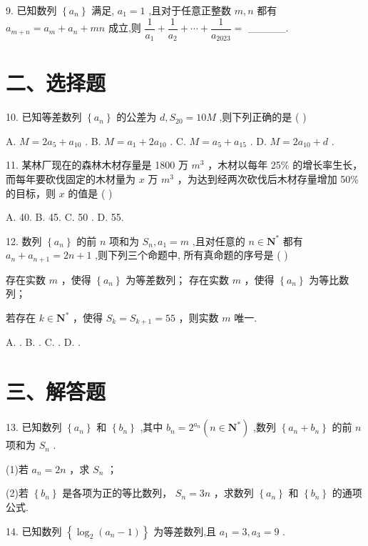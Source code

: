 9. 已知数列 $\left\{  {a}_{n}\right\}$ 满足, ${a}_{1} = 1$ ,且对于任意正整数 $m,n$ 都有 ${a}_{m + n} = {a}_{m} + {a}_{n} + {mn}$ 成立,则 $\dfrac{1}{{a}_{1}} + \dfrac{1}{{a}_{2}} + \cdots  +  \dfrac{1}{{a}_{2023}} =$ \_\_\_\_\_.

\section*{二、选择题}

10. 已知等差数列 $\left\{  {a}_{n}\right\}$ 的公差为 $d,{S}_{20} = {10M}$ ,则下列正确的是 ( )

A. $M = 2{a}_{5} + {a}_{10}$ . B. $M = {a}_{1} + 2{a}_{10}$ . C. $M = {a}_{5} + {a}_{15}$ . D. $M = 2{a}_{10} + d$ .

11. 某林厂现在的森林木材存量是 1800 万 ${{m}}^{3}$ ，木材以每年 25\% 的增长率生长，而每年要砍伐固定的木材量为 $x$ 万 ${{m}}^{3}$ ，为达到经两次砍伐后木材存量增加 50\% 的目标，则 $x$ 的值是 ( )

A. 40. B. 45. C. 50 . D. 55.

12. 数列 $\left\{  {a}_{n}\right\}$ 的前 $n$ 项和为 ${S}_{n},{a}_{1} = m$ ,且对任意的 $n \in  {\mathbf{N}}^{ * }$ 都有 ${a}_{n} + {a}_{n + 1} = {2n} + 1$ ,则下列三个命题中, 所有真命题的序号是 ( )

   存在实数 $m$ ，使得 $\left\{  {a}_{n}\right\}$ 为等差数列；   存在实数 $m$ ，使得 $\left\{  {a}_{n}\right\}$ 为等比数列；

  若存在 $k \in  {\mathbf{N}}^{ * }$ ，使得 ${S}_{k} = {S}_{k + 1} = {55}$ ，则实数 $m$ 唯一.

A.   . B.     . C.     . D.       .

\section*{三、解答题}

13. 已知数列 $\left\{  {a}_{n}\right\}$ 和 $\left\{  {b}_{n}\right\}$ ,其中 ${b}_{n} = {2}^{{a}_{n}}\left( {n \in  {\mathbf{N}}^{ * }}\right)$ ,数列 $\left\{  {{a}_{n} + {b}_{n}}\right\}$ 的前 $n$ 项和为 ${S}_{n}$ .

(1)若 ${a}_{n} = {2n}$ ，求 ${S}_{n}$ ；

(2)若 $\left\{  {b}_{n}\right\}$ 是各项为正的等比数列， ${S}_{n} = {3n}$ ，求数列 $\left\{  {a}_{n}\right\}$ 和 $\left\{  {b}_{n}\right\}$ 的通项公式.

14. 已知数列 $\left\{  {{\log }_{2}\left( {{a}_{n} - 1}\right) }\right\}$ 为等差数列,且 ${a}_{1} = 3,{a}_{3} = 9$ .

